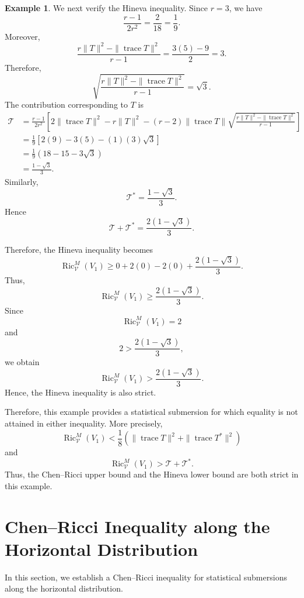 \documentclass[10pt,a4paper]{article}
\theoremstyle{definition}
\newtheorem{example}[theorem]{Example}
\theoremstyle{remark}
\numberwithin{equation}{section}
\begin{document}
\begin{example}
We next verify the Hineva inequality. Since $r=3$, we have
\[
\frac{r-1}{2r^{2}}
=
\frac{2}{18}
=
\frac19.
\]
Moreover,
\[
\frac{
r\|T\|^{2}
-
\|\operatorname{trace}T\|^{2}
}{r-1}
=
\frac{3(5)-9}{2}
=
3.
\]
Therefore,
\[
\sqrt{
\frac{
r\|T\|^{2}
-
\|\operatorname{trace}T\|^{2}
}{r-1}
}
=
\sqrt{3}.
\]
The contribution corresponding to $T$ is
\[
\begin{aligned}
\mathcal{T}
&=
\frac{r-1}{2r^{2}}
\left[
2\|\operatorname{trace}T\|^{2}
-r\|T\|^{2}
-(r-2)
\|\operatorname{trace}T\|
\sqrt{
\frac{
r\|T\|^{2}
-
\|\operatorname{trace}T\|^{2}
}{r-1}
}
\right]\\
&=
\frac19
\left[
2(9)-3(5)
-(1)(3)\sqrt{3}
\right]\\
&=
\frac19
\left(
18-15-3\sqrt{3}
\right)\\
&=
\frac{1-\sqrt{3}}{3}.
\end{aligned}
\]
Similarly,
\[
\mathcal{T}^{*}
=
\frac{1-\sqrt{3}}{3}.
\]
Hence
\[
\mathcal{T}+\mathcal{T}^{*}
=
\frac{2(1-\sqrt{3})}{3}.
\]

Therefore, the Hineva inequality becomes
\[
\operatorname{Ric}^{M}_{\mathcal V}(V_{1})
\geq
0+2(0)-2(0)
+
\frac{2(1-\sqrt{3})}{3}.
\]
Thus,
\[
\operatorname{Ric}^{M}_{\mathcal V}(V_{1})
\geq
\frac{2(1-\sqrt{3})}{3}.
\]
Since
\[
\operatorname{Ric}^{M}_{\mathcal V}(V_{1})=2
\]
and
\[
2>
\frac{2(1-\sqrt{3})}{3},
\]
we obtain
\[
\boxed{
\operatorname{Ric}^{M}_{\mathcal V}(V_{1})
>
\frac{2(1-\sqrt{3})}{3}.
}
\]
Hence, the Hineva inequality is also strict.

Therefore, this example provides a statistical submersion for which
equality is not attained in either inequality. More precisely,
\[
\boxed{
\operatorname{Ric}^{M}_{\mathcal V}(V_{1})
<
\frac18
\left(
\|\operatorname{trace}T\|^{2}
+
\|\operatorname{trace}T^{*}\|^{2}
\right)
}
\]
and
\[
\boxed{
\operatorname{Ric}^{M}_{\mathcal V}(V_{1})
>
\mathcal{T}+\mathcal{T}^{*}.
}
\]
Thus, the Chen--Ricci upper bound and the Hineva lower bound are both
strict in this example.
\end{example}


\section{Chen--Ricci Inequality along the Horizontal Distribution}

In this section, we establish a Chen--Ricci inequality for statistical
submersions along the horizontal distribution.
\end{document}
